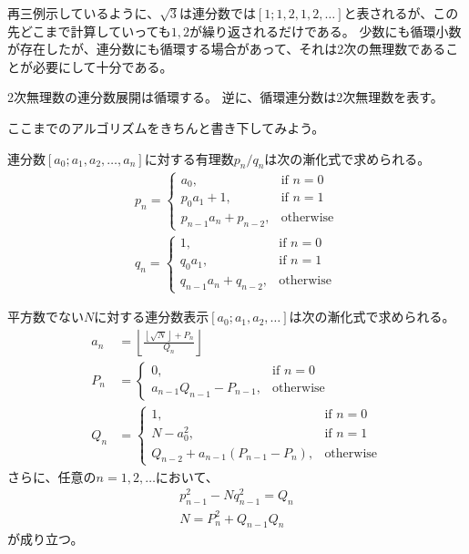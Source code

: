 再三例示しているように、$\sqrt{3}$は連分数では$[1;1,2,1,2,\ldots]$と表されるが、この先どこまで計算していっても$1,2$が繰り返されるだけである。
少数にも循環小数が存在したが、連分数にも循環する場合があって、それは2次の無理数であることが必要にして十分である。

\begin{Prop}{}{}
2次無理数の連分数展開は循環する。
逆に、循環連分数は2次無理数を表す。
\end{Prop}

ここまでのアルゴリズムをきちんと書き下してみよう。

\begin{Prop}{}{}
連分数$[a_0;a_1,a_2,\ldots,a_n]$に対する有理数$p_n/q_n$は次の漸化式で求められる。
\begin{align*}
p_n = 
\begin{cases}
a_0, &\mbox{if } n = 0\\
p_0a_1 + 1, &\mbox{if } n = 1\\
p_{n-1}a_n + p_{n-2}, &\mbox{otherwise}
\end{cases}
\\
q_n = 
\begin{cases}
1, &\mbox{if } n = 0\\
q_0a_1, &\mbox{if } n = 1\\
q_{n-1}a_n + q_{n-2}, &\mbox{otherwise}
\end{cases}
\end{align*}
\end{Prop}

\begin{Prop}{}{}
平方数でない$N$に対する連分数表示$[a_0;a_1,a_2,\ldots]$は次の漸化式で求められる。
\begin{align*}
a_n &= \left \lfloor \frac{\left \lfloor \sqrt{N} \right \rfloor + P_n}{Q_n} \right \rfloor\\
P_n &= 
\begin{cases}
0, &\mbox{if } n = 0\\
a_{n-1} Q_{n-1} - P_{n-1}, &\mbox{otherwise}
\end{cases}
\\
Q_n &= 
\begin{cases}
1, &\mbox{if } n = 0\\
N - a_0^2, &\mbox{if } n = 1\\
Q_{n-2} + a_{n-1}(P_{n-1} - P_n), &\mbox{otherwise}
\end{cases}
\end{align*}
さらに、任意の$n=1,2,\ldots$において、
\begin{align*}
p_{n-1}^2 - N q_{n-1}^2 = Q_n\\
N = P_n^2 + Q_{n-1}Q_n
\end{align*}
が成り立つ。
\end{Prop}

